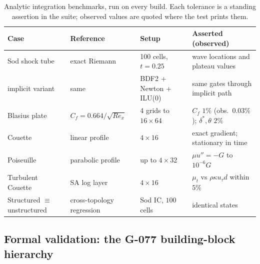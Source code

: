 \documentclass[journal,biblatex]{new-aiaa}
\begin{document}
\begin{table}[H]
\centering\footnotesize\setlength{\tabcolsep}{5pt}
\caption{Analytic integration benchmarks, run on every build. Each tolerance
is a standing assertion in the suite; observed values are quoted where the
test prints them.}
\label{tab:analytic}
\begin{tabular}{@{}llll@{}}
\toprule
Case & Reference & Setup & Asserted (observed) \\
\midrule
Sod shock tube & exact Riemann~\cite{toro_riemann_2009} & 100 cells, $t{=}0.25$ & wave locations and plateau values \\
\quad implicit variant & same & BDF2 + Newton + ILU(0) & same gates through implicit path \\
Blasius plate & $C_f=0.664/\sqrt{Re_x}$ & 4 grids to $16\times64$ & $C_f$ $1\%$ (obs.\ $0.03\%$); $\delta^\ast,\theta$ $2\%$ \\
Couette & linear profile & $4\times16$ & exact gradient; stationary in time \\
Poiseuille & parabolic profile & up to $4\times32$ & $\mu u''=-G$ to $10^{-6}G$ \\
Turbulent Couette & SA log layer & $4\times16$ & $\mu_t$ vs $\rho\kappa u_\tau d$ within $5\%$ \\
Structured $\equiv$ unstructured & cross-topology regression & Sod IC, $100$ cells & identical states \\
\bottomrule
\end{tabular}
\end{table}

\subsection{Formal validation: the G-077 building-block hierarchy}
\label{sec:vv-val}
\end{document}
